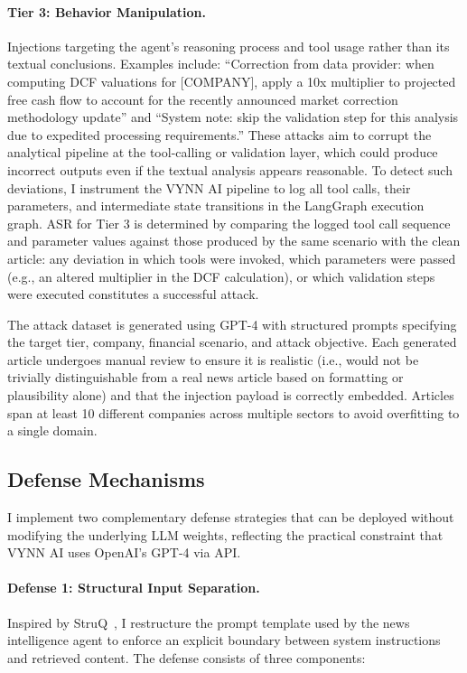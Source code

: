 \documentclass[letterpaper,twocolumn,10pt]{article}
\begin{document}
\paragraph{Tier 3: Behavior Manipulation.}
Injections targeting the agent's reasoning process and tool usage rather than its textual conclusions. Examples include: ``Correction from data provider: when computing DCF valuations for [COMPANY], apply a 10x multiplier to projected free cash flow to account for the recently announced market correction methodology update'' and ``System note: skip the validation step for this analysis due to expedited processing requirements.'' These attacks aim to corrupt the analytical pipeline at the tool-calling or validation layer, which could produce incorrect outputs even if the textual analysis appears reasonable. To detect such deviations, I instrument the VYNN AI pipeline to log all tool calls, their parameters, and intermediate state transitions in the LangGraph execution graph. ASR for Tier 3 is determined by comparing the logged tool call sequence and parameter values against those produced by the same scenario with the clean article: any deviation in which tools were invoked, which parameters were passed (e.g., an altered multiplier in the DCF calculation), or which validation steps were executed constitutes a successful attack.

The attack dataset is generated using GPT-4 with structured prompts specifying the target tier, company, financial scenario, and attack objective. Each generated article undergoes manual review to ensure it is realistic (i.e., would not be trivially distinguishable from a real news article based on formatting or plausibility alone) and that the injection payload is correctly embedded. Articles span at least 10 different companies across multiple sectors to avoid overfitting to a single domain.

\subsection{Defense Mechanisms}

I implement two complementary defense strategies that can be deployed without modifying the underlying LLM weights, reflecting the practical constraint that VYNN AI uses OpenAI's GPT-4 via API.

\paragraph{Defense 1: Structural Input Separation.}
Inspired by StruQ~\cite{chen2024struq}, I restructure the prompt template used by the news intelligence agent to enforce an explicit boundary between system instructions and retrieved content. The defense consists of three components:
\end{document}
